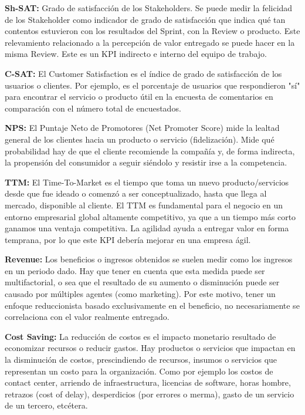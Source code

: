   \begin{description}
 
  \item {\textbf{Sh-SAT:} Grado de satisfacción de los Stakeholders. Se puede medir la felicidad de los Stakeholder como indicador de grado de satisfacción que indica qué tan contentos estuvieron con los resultados del Sprint, con la Review o producto. Este relevamiento relacionado a la percepción de valor entregado se puede hacer en la misma Review. Este es un KPI indirecto e interno del equipo de trabajo.
}

  \item {\textbf{C-SAT:} El Customer Satisfaction es el índice de grado de satisfacción de los usuarios o clientes. Por ejemplo, es el porcentaje de usuarios que respondieron "sí" para encontrar el servicio o producto útil en la encuesta de comentarios en comparación con el número total de encuestados.
}

  \item {\textbf{NPS:} El Puntaje Neto de Promotores (Net Promoter Score) mide la lealtad general de los clientes hacia un producto o servicio (fidelización). Mide qué probabilidad hay de que el cliente recomiende la compañía y, de forma indirecta, la propensión del consumidor a seguir siéndolo y resistir irse a la competencia.
}

  \item {\textbf{TTM:} El Time-To-Market es el tiempo que toma un nuevo producto/servicios desde que fue ideado o comenzó a ser conceptualizado, hasta que llega al mercado, disponible al cliente. El TTM es fundamental para el negocio en un entorno empresarial global altamente competitivo, ya que a un tiempo más corto ganamos una ventaja competitiva. La agilidad ayuda a entregar valor en forma temprana, por lo que este KPI debería mejorar en una empresa ágil.
}

  \item {\textbf{Revenue:} Los beneficios o ingresos obtenidos se suelen medir como los ingresos en un periodo dado. Hay que tener en cuenta que esta medida puede ser multifactorial, o sea que el resultado de su aumento o disminución puede ser causado por múltiples agentes (como marketing). Por este motivo, tener un enfoque reduccionista basado exclusivamente en el beneficio, no necesariamente se correlaciona con el valor realmente entregado.
}

  \item {\textbf{Cost Saving:} La reducción de costos es el impacto monetario resultado de economizar recursos o reducir gastos. Hay productos o servicios que impactan en la disminución de costos, prescindiendo de recursos, insumos o servicios que representan un costo para la organización. Como por ejemplo los costos de contact center, arriendo de infraestructura, licencias de software, horas hombre, retrazos (cost of delay), desperdicios (por errores o merma), gasto de un servicio de un tercero, etcétera.
}


\end{description}

